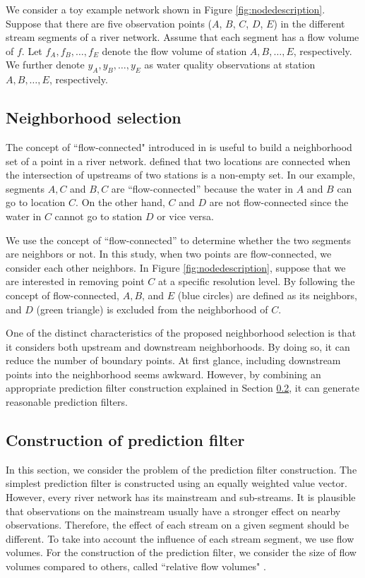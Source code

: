 \documentclass[11pt,titlepage]{article}
\begin{document}
We consider a toy example network shown in Figure \ref{fig:nodedescription}. Suppose that there are five observation points ($A$, $B$, $C$, $D$, $E$) in the different stream segments of a river network. Assume that each segment has a flow volume of $f$. Let $f_A, f_B, \ldots, f_E$ denote the flow volume of station $A, B,\ldots, E$, respectively. We further denote $y_A, y_B, \ldots, y_E$ as water quality observations at station $A, B, \ldots, E$, respectively.

\subsection{Neighborhood selection}\label{subsec:nbd}

The concept of ``flow-connected" introduced in \cite{VerHoef(2006)} is useful to build a neighborhood set of a point in a river network. \cite{VerHoef(2006)} defined that two locations are connected when the intersection of upstreams of two stations is a non-empty set. In our example, segments $A, C$ and $B, C$ are ``flow-connected'' because the water in $A$ and $B$ can go to location $C$. On the other hand, $C$ and $D$ are not flow-connected since the water in $C$ cannot go to station $D$ or vice versa. 

We use the concept of ``flow-connected'' to determine whether the two segments are neighbors or not. In this study, when two points are flow-connected, we consider each other neighbors. In Figure \ref{fig:nodedescription}, suppose that we are interested in removing point $C$ at a specific resolution level. By following the concept of flow-connected, $A, B$, and $E$ (blue circles) are defined as its neighbors, and $D$ (green triangle) is excluded from the neighborhood of $C$.

One of the distinct characteristics of the proposed neighborhood selection is that it considers both upstream and downstream neighborhoods. By doing so, it can reduce the number of boundary points. At first glance, including downstream points into the neighborhood seems awkward. However, by combining an appropriate prediction filter construction explained in Section \ref{subsec:pf}, it can generate reasonable prediction filters.

\subsection{Construction of prediction filter }\label{subsec:pf}

In this section, we consider the problem of the prediction filter construction. The simplest prediction filter is constructed using an equally weighted value vector. However, every river network has its mainstream and sub-streams. It is plausible that observations on the mainstream usually have a stronger effect on nearby observations. Therefore, the effect of each stream on  a given segment should be different. To take into account the influence of each stream segment, we use flow volumes. For the construction of the prediction filter, we consider the size of flow volumes compared to others, called ``relative flow volumes" \citep{ODonnell2014}.
\end{document}
